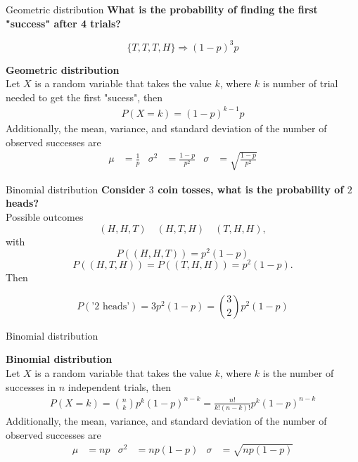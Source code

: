 \documentclass[12pt,a4paper]{beamer}
\begin{document}
\begin{frame}{Geometric distribution}
\textbf{What is the probability of finding the first "success" after 4 trials? }

\[\{T,T,T,H\}\Rightarrow (1-p)^3p\]
\small\begin{framed}
		\textbf{Geometric distribution}\\
		Let $X$ is a random variable that takes the value $k$,  where $k$ is number of trial needed to get the first "sucess", then \vspace{-1mm}
\begin{eqnarray*}
P(X=k)=(1-p)^{k-1}p
\end{eqnarray*}
Additionally, the mean, variance, and standard deviation of the number of observed successes are\vspace{-2mm}
\begin{align*}
\mu &= \frac{1}{p}
	&\sigma^2 &= \frac{1-p}{p^2}
	&\sigma &= \sqrt{ \frac{1-p}{p^2}}
\label{binomialStats}
\end{align*}
\end{framed}



\end{frame}
\begin{frame}{Binomial distribution}
\textbf{Consider $3$ coin tosses, what is the probability of $2$ heads?}\\
Possible outcomes
\[(H,H,T)\quad (H,T,H)\quad (T,H,H),\]
with 
\[P((H,H,T))=p^2(1-p)\]
\[ P((H,T,H))=P((T,H,H))=p^2(1-p).\]
Then 

\[P(\text{'2 heads'})=3p^2(1-p)={3\choose 2}p^2(1-p)\]
\end{frame}
\begin{frame}{Binomial distribution} 
	
	
	
	\begin{framed}
		\textbf{Binomial distribution}\\
		Let $X$ is a random variable that takes the value $k$,  where $k$ is the number of  successes in $n$ independent trials, then \vspace{-1mm}
\begin{eqnarray*}
P(X=k)={n\choose k}p^k(1-p)^{n-k} = \frac{n!}{k!(n-k)!}p^k(1-p)^{n-k}
\end{eqnarray*}
Additionally, the mean, variance, and standard deviation of the number of observed successes are\vspace{-2mm}
\begin{align*}
\mu &= np
	&\sigma^2 &= np(1-p)
	&\sigma &= \sqrt{np(1-p)}
\label{binomialStats}
\end{align*}
\end{framed}
\end{frame}
\end{document}
